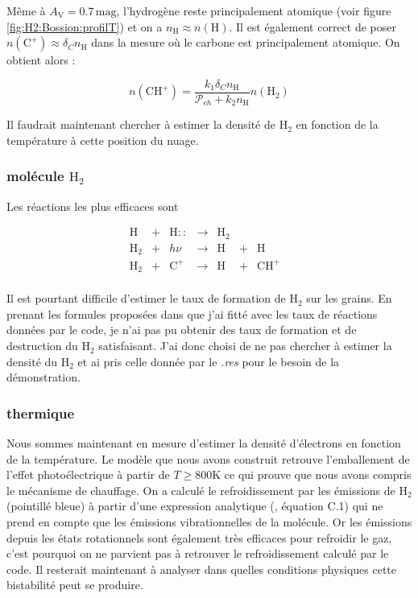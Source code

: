 Même à $A_\mathrm{V} = 0.7 \,\mathrm{mag}$, l'hydrogène reste principalement atomique (voir figure \ref{fig:H2:Bossion:profilT}) et on a $n_\mathrm{H}\approx n(\mathrm{H})$. Il est également correct de poser $n(\mathrm{C}^+)\approx \delta_C n_\mathrm{H}$ dans la mesure où le carbone est principalement atomique. On obtient alors :

\begin{equation}
\boxed{
    n(\mathrm{CH}^+) = \frac{k_1\delta_Cn_\mathrm{H}}{\mathcal{P}_{ch} + k_2n_\mathrm{H}} n(\mathrm{H}_2)
    }
\end{equation}

Il faudrait maintenant chercher à estimer la densité de $\mathrm{H}_2$ en fonction de la température à cette position du nuage. 

\subsubsection{molécule $\mathrm{H}_2$}

Les réactions les plus efficaces sont  

\begin{equation}\label{eq:sysH}
    \begin{array}{lllllllr}
        \mathrm{H}    & + &\mathrm{H}::   & \rightarrow &\mathrm{H}_2  & & &   \\
        \mathrm{H}_2  & + & h\nu  & \rightarrow &\mathrm{H}   & +  & \mathrm{H} &  \\
        \mathrm{H}_2  & + & \mathrm{C}^+  & \rightarrow &\mathrm{H}   & +  & \mathrm{CH}^+ &  \\
    \end{array}
\end{equation}

Il est pourtant difficile d'estimer le taux de formation de $\mathrm{H}_2$ sur les grains. En prenant les formules proposées dans \cite{Rollig2005} que j'ai fitté avec les taux de réactions données par le code, je n'ai pas pu obtenir des taux de formation et de destruction du $\mathrm{H}_2$ satisfaisant. J'ai donc choisi de ne pas chercher à estimer  la densité du $\mathrm{H}_2$ et ai pris celle donnée par le \textit{.res} pour le besoin de la démonstration.

\subsubsection{thermique}

Nous sommes maintenant en mesure d'estimer la densité d'électrons en fonction de la température. Le modèle que nous avons construit retrouve l'emballement de l'effet photoélectrique à partir de $T\geq 800$K ce qui prouve que nous avons compris le mécanisme de chauffage. On a calculé le refroidissement par les émissions de $\mathrm{H}_2$ (pointillé bleue) à partir d'une expression analytique (\cite{Rollig2005}, équation C.1) qui ne prend en compte que les émissions vibrationnelles de la molécule. Or les émissions depuis les états rotationnels sont également très efficaces pour refroidir le gaz, c'est pourquoi on ne parvient pas à retrouver le refroidissement calculé par le code. Il resterait maintenant à analyser dans quelles conditions physiques cette bistabilité peut se produire.

